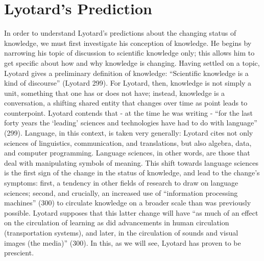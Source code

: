 \documentclass[titlepage]{article}
\begin{document}
\section{Lyotard's Prediction}\label{lyotards-prediction}

In order to understand Lyotard's predictions about the changing status
of knowledge, we must first investigate his conception of knowledge. He
begins by narrowing his topic of discussion to scientific knowledge
only; this allows him to get specific about how and why knowledge is
changing. Having settled on a topic, Lyotard gives a preliminary
definition of knowledge: ``Scientific knowledge is a kind of discourse''
(Lyotard 299). For Lyotard, then, knowledge is not simply a unit,
something that one has or does not have; instead, knowledge is a
conversation, a shifting shared entity that changes over time as point
leads to counterpoint. Lyotard contends that - at the time he was
writing - ``for the last forty years the `leading' sciences and
technologies have had to do with language'' (299). Language, in this
context, is taken very generally: Lyotard cites not only sciences of
linguistics, communication, and translations, but also algebra, data,
and computer programming. Language sciences, in other words, are those
that deal with manipulating symbols of meaning. This shift towards
language sciences is the first sign of the change in the status of
knowledge, and lead to the change's symptoms: first, a tendency in other
fields of research to draw on language sciences; second, and crucially,
an increased use of ``information processing machines'' (300) to
circulate knowledge on a broader scale than was previously possible.
Lyotard supposes that this latter change will have ``as much of an
effect on the circulation of learning as did advancements in human
circulation (transportation systems), and later, in the circulation of
sounds and visual images (the media)'' (300). In this, as we will see,
Lyotard has proven to be prescient.
\end{document}
